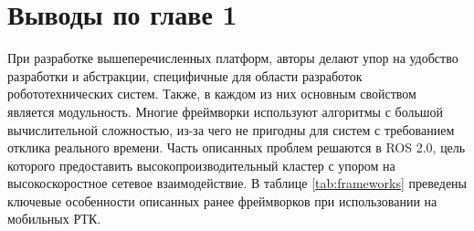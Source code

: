 \section*{Выводы по главе 1}

При разработке вышеперечисленных платформ, авторы делают упор на удобство разработки и абстракции, специфичные для области разработок робототехнических систем. Также, в каждом из них основным свойством является модульность. Многие фреймворки используют алгоритмы с большой вычислительной сложностью, из-за чего не пригодны для систем с требованием отклика реального времени. Часть описанных проблем решаются в ROS 2.0, цель которого предоставить высокопроизводительный кластер с упором на высокоскоростное сетевое взаимодействие. В таблице \ref{tab:frameworks} преведены ключевые особенности описанных ранее фреймворков при использовании на мобильных РТК.

